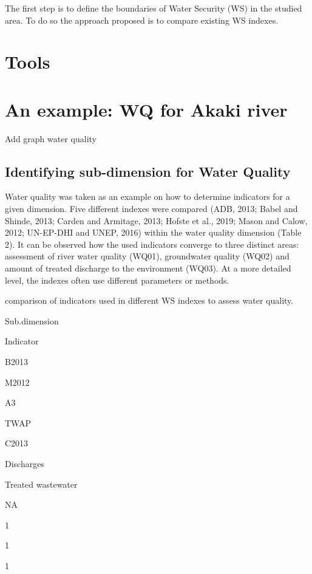 \documentclass[
]{book}
\begin{document}
The first step is to define the boundaries of Water Security (WS) in the studied area. To do so the approach proposed is to compare existing WS indexes.

\hypertarget{tools-1}{%
\section{Tools}\label{tools-1}}

\hypertarget{an-example-wq-for-akaki-river}{%
\section{An example: WQ for Akaki river}\label{an-example-wq-for-akaki-river}}

Add graph water quality

\hypertarget{identifying-sub-dimension-for-water-quality}{%
\subsection{Identifying sub-dimension for Water Quality}\label{identifying-sub-dimension-for-water-quality}}

Water quality was taken as an example on how to determine indicators for a given dimension. Five different indexes were compared (ADB, 2013; Babel and Shinde, 2013; Carden and Armitage, 2013; Hofste et al., 2019; Mason and Calow, 2012; UN-EP-DHI and UNEP, 2016) within the water quality dimension (Table 2). It can be observed how the used indicators converge to three distinct areas: assessment of river water quality (WQ01), groundwater quality (WQ02) and amount of treated discharge to the environment (WQ03). At a more detailed level, the indexes often use different parameters or methods.

\label{tab:unnamed-chunk-4}comparison of indicators used in different WS indexes to assess water quality.

Sub.dimension

Indicator

B2013

M2012

A3

TWAP

C2013

Discharges

Treated wastewater

NA

1

1

1
\end{document}
